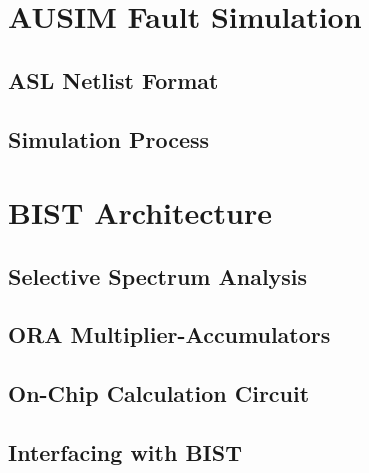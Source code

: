 \documentclass[12pt]{report}
\begin{document}
\section{AUSIM Fault Simulation}

\subsection{ASL Netlist Format}

\subsection{Simulation Process}

\section{BIST Architecture}

\subsection{Selective Spectrum Analysis}

\subsection{ORA Multiplier-Accumulators}

\subsection{On-Chip Calculation Circuit}

\subsection{Interfacing with BIST}
\end{document}
